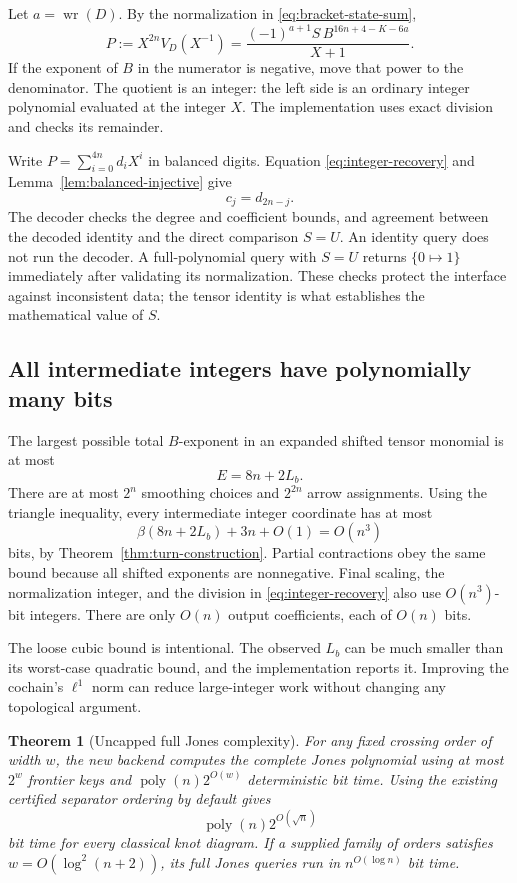 \documentclass[11pt]{article}
\newtheorem{theorem}{Theorem}[section]
\theoremstyle{definition}
\theoremstyle{remark}
\newcommand{\poly}{\operatorname{poly}}
\begin{document}
Let $a=\operatorname{wr}(D)$. By the normalization in
\eqref{eq:bracket-state-sum},
\begin{equation}\label{eq:integer-recovery}
 P:=X^{2n}V_D(X^{-1})
   =\frac{(-1)^{a+1}S\,B^{16n+4-K-6a}}{X+1}.
\end{equation}
If the exponent of $B$ in the numerator is negative, move that power to
the denominator. The quotient is an integer: the left side is an
ordinary integer polynomial evaluated at the integer $X$.
The implementation uses exact division and checks its remainder.

Write $P=\sum_{i=0}^{4n}d_iX^i$ in balanced digits. Equation
\eqref{eq:integer-recovery} and Lemma~\ref{lem:balanced-injective} give
\[
 c_j=d_{2n-j}.
\]
The decoder checks the degree and coefficient bounds, and agreement
between the decoded identity and the direct comparison $S=U$. An identity
query does not run the decoder. A full-polynomial query with $S=U$ returns
$\{0\mapsto1\}$ immediately after validating its normalization.
These checks protect the interface against inconsistent data; the tensor
identity is what establishes the mathematical value of $S$.

\subsection{All intermediate integers have polynomially many bits}

The largest possible total $B$-exponent in an expanded shifted tensor
monomial is at most
\[
 E=8n+2L_b.
\]
There are at most $2^n$ smoothing choices and $2^{2n}$ arrow assignments.
Using the triangle inequality, every intermediate integer coordinate
has at most
\begin{equation}\label{eq:bit-bound}
 \beta(8n+2L_b)+3n+O(1)=O(n^3)
\end{equation}
bits, by Theorem~\ref{thm:turn-construction}. Partial contractions obey
the same bound because all shifted exponents are nonnegative. Final
scaling, the normalization integer, and the division in
\eqref{eq:integer-recovery} also use $O(n^3)$-bit integers.
There are only $O(n)$ output coefficients, each of $O(n)$ bits.

The loose cubic bound is intentional. The observed $L_b$ can be much
smaller than its worst-case quadratic bound, and the implementation
reports it. Improving the cochain's $\ell^1$ norm can reduce large-integer
work without changing any topological argument.

\begin{theorem}[Uncapped full Jones complexity]
\label{thm:full-jones}
For any fixed crossing order of width $w$, the new backend computes the
complete Jones polynomial using at most $2^w$ frontier keys and
$\poly(n)2^{O(w)}$ deterministic bit time. Using the existing certified
separator ordering by default gives
\[
 \poly(n)2^{O(\sqrt n)}
\]
bit time for every classical knot diagram. If a supplied family of
orders satisfies $w=O(\log^2(n+2))$, its full Jones queries run in
$n^{O(\log n)}$ bit time.
\end{theorem}
\end{document}

